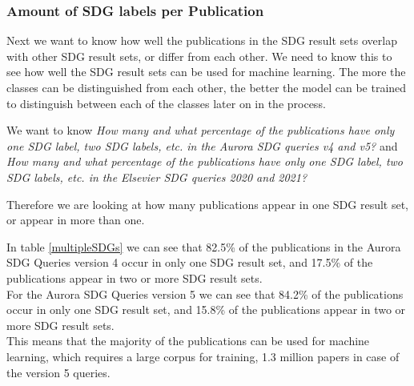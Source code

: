 \documentclass{article}
\begin{document}

\subsubsection{Amount of SDG labels per Publication}
Next we want to know how well the publications in the SDG result sets overlap with other SDG result sets, or differ from each other.  
We need to know this to see how well the SDG result sets can be used for machine learning. The more the classes can be distinguished from each other, the better the model can be trained to distinguish between each of the classes later on in the process.

We want to know \emph{How many and what percentage of the publications have only one SDG label, two SDG labels, etc. in the Aurora SDG queries v4 and v5?} and \emph{How many and what percentage of the publications have only one SDG label, two SDG labels, etc. in the Elsevier SDG queries 2020 and 2021?}

Therefore we are looking at how many publications appear in one SDG result set, or appear in more than one. 

In table \ref{multipleSDGs} we can see that 82.5\% of the publications in the Aurora SDG Queries version 4 occur in only one SDG result set, and 17.5\% of the publications appear in two or more SDG result sets.\\
For the Aurora SDG Queries version 5 we can see that 84.2\% of the publications occur in only one SDG result set, and 15.8\% of the publications appear in two or more SDG result sets.\\
This means that the majority of the publications can be used for machine learning, which requires a large corpus for training, 1.3 million papers in case of the version 5 queries.
\end{document}
